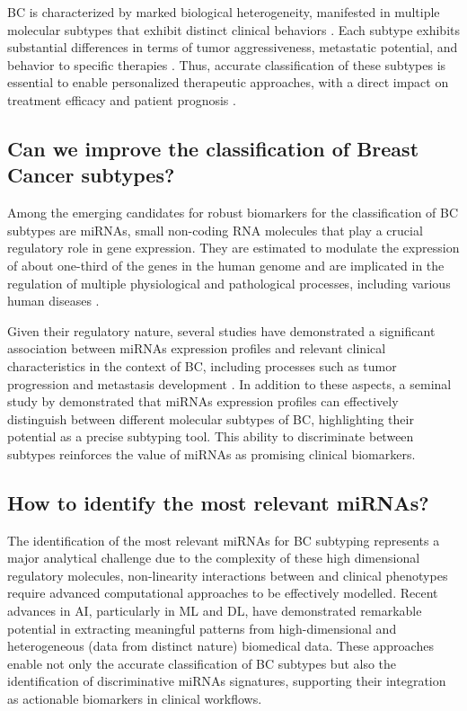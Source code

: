 BC is characterized by marked biological heterogeneity, manifested in multiple
molecular subtypes that exhibit distinct clinical behaviors
\textcite{bc_molecular_Perou2000}. Each subtype exhibits substantial
differences in terms of tumor aggressiveness, metastatic potential, and
behavior to specific therapies \textcite{bc_subtypes_Prat2015Clinical}. Thus,
accurate classification of these subtypes is essential to enable personalized
therapeutic approaches, with a direct impact on treatment efficacy and patient
prognosis \textcite{need_for_subtype_treatments_Testa2020Breast}.

\subsection{Can we improve the classification of Breast Cancer subtypes?}
Among the emerging candidates for robust biomarkers for the classification of
\gls{BC} subtypes are \gls{miRNAs}, small non-coding RNA molecules that play a
crucial regulatory role in gene expression. They are estimated to modulate the
expression of about one-third of the genes in the human genome
\textcite{mirna_importance_Hammond2015An} and are implicated in the regulation
of multiple physiological and pathological processes, including various human
diseases \textcite{mirna_as_biomarkers_Ho2022}.

Given their regulatory nature, several studies have demonstrated a significant
association between \gls{miRNAs} expression profiles and relevant clinical
characteristics in the context of \gls{BC}, including processes such as tumor
progression and metastasis development \textcite{mirna_as_biomarkers_Ho2022}
\textcite{mirnas_in_bc_Muñoz2023}. In addition to these aspects, a seminal
study by \textcite{mirna_as_bio_for_sub_Blenkiron2007MicroRNA} demonstrated
that \gls{miRNAs} expression profiles can effectively distinguish between
different molecular subtypes of \gls{BC}, highlighting their potential as a
precise subtyping tool. This ability to discriminate between subtypes
reinforces the value of \gls{miRNAs} as promising clinical biomarkers.

\subsection{How to identify the most relevant miRNAs?}

The identification of the most relevant \gls{miRNAs} for \gls{BC} subtyping
represents a major analytical challenge due to the complexity of these high
dimensional regulatory molecules, non-linearity interactions between and
clinical phenotypes require advanced computational approaches to be effectively
modelled. Recent advances in \gls{AI}, particularly in \gls{ML} and \gls{DL},
have demonstrated remarkable potential in extracting meaningful patterns from
high-dimensional and heterogeneous (data from distinct nature) biomedical data.
These approaches enable not only the accurate classification of \gls{BC}
subtypes but also the identification of discriminative \gls{miRNAs} signatures,
supporting their integration as actionable biomarkers in clinical workflows.


